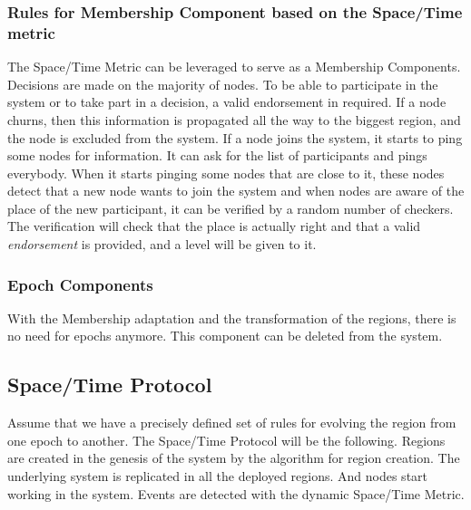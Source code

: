 \documentclass[a4paper,11pt,oneside]{report}
\begin{document}
\subsubsection{Rules for Membership Component based on the Space/Time metric}
The Space/Time Metric can be leveraged to serve as a Membership Components.
Decisions are made on the majority of nodes. To be able to participate in
the system or to take part in a decision, a valid endorsement in required. If a
node churns, then this information is propagated all the way to the
biggest region, and the node is excluded from the system.  If a node joins the
system, it starts to ping some nodes for information. It can ask for the list
of participants and pings everybody. When it starts pinging some nodes that are
close to it, these nodes detect that a new node wants to join the system and
when nodes are aware of the place of the new participant, it can be verified by
a random number of checkers. The verification will check that the place is
actually right and that a valid \textit{endorsement} is provided, and a level
will be given to it. 

\subsubsection{Epoch Components}
With the Membership adaptation and the transformation of the regions, there is
no need for epochs anymore. This component can be deleted from the system. 

\subsection{Space/Time Protocol}
Assume that we have a precisely defined set of rules for evolving the region
from one epoch to another.  The Space/Time Protocol will be the following.
Regions are created in the genesis of the system by the algorithm for region
creation. The underlying system is replicated in all the deployed regions. And
nodes start working in the system. Events are detected with the dynamic
Space/Time Metric. 
\end{document}
